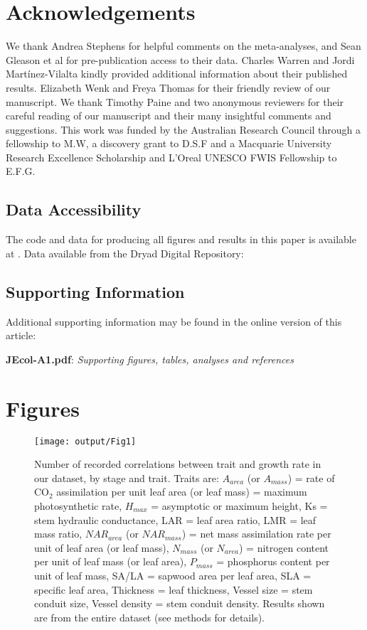 \documentclass[a4paper,11pt]{article}
\begin{document}
\section*{Acknowledgements}\label{Acknowledgment}

We thank Andrea Stephens for helpful comments on the meta-analyses, and Sean Gleason et al for pre-publication access to their data. Charles Warren and Jordi Mart{\'{i}}nez-Vilalta kindly provided additional information about their published results. Elizabeth Wenk and Freya Thomas for their friendly review of our manuscript. We thank Timothy Paine and two anonymous reviewers for their careful reading of our manuscript and their many insightful comments and suggestions. This work was funded by the Australian Research Council through a fellowship to M.W, a discovery grant to D.S.F and a Macquarie University Research Excellence Scholarship and L'Oreal UNESCO FWIS Fellowship to E.F.G.

\subsection*{Data Accessibility}\label{code}

The code and data for producing all figures and results in this paper is available at . Data available from the Dryad Digital Repository: 


\subsection{Supporting Information}
Additional supporting information may be found in the online version of this article: 

{\bf JEcol-A1.pdf}: {\it Supporting figures, tables, analyses and references}


\linespread{1}
\label{references}

\clearpage
\section*{Figures}

\begin{figure}[h!]
\centering
\texttt{[image: output/Fig1]}
\caption{Number of recorded correlations between trait and growth rate in our dataset, by stage and trait. Traits are: $A_{area}$ (or $A_{mass}$) = rate of CO$_{2}$ assimilation per unit leaf area (or leaf mass) = maximum photosynthetic rate, $H_{max}$ = asymptotic or maximum height, Ks = stem hydraulic conductance, LAR = leaf area ratio, LMR = leaf mass ratio, $NAR_{area}$  (or $NAR_{mass}$) = net mass assimilation rate per unit of leaf area (or leaf mass), $N_{mass}$ (or $N_{area}$) = nitrogen content per unit of leaf mass (or leaf area), $P_{mass}$ = phosphorus content per unit of leaf mass, SA/LA = sapwood area per leaf area, SLA = specific leaf area, Thickness = leaf thickness, Vessel size = stem conduit size, Vessel density = stem conduit density. Results shown are from the entire dataset (see methods for details).}
\label{fig:fig1}
\end{figure}
\end{document}
